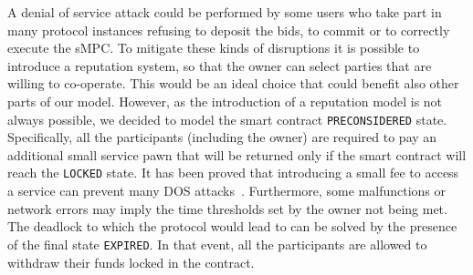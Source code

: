 A denial of service attack could be performed by some users who take part in many \shortname protocol instances refusing to deposit the bids, to commit or to correctly execute the sMPC. 
To mitigate these kinds of disruptions it is possible to introduce a reputation system, so that the owner can select parties that are willing to co-operate. 
This would be an ideal choice that could benefit also other parts of our model. However, as the introduction of a reputation model is not always possible, we decided to model the smart contract \texttt{PRE\textunderscore CONSIDERED} state. 
Specifically, all the participants (including the owner) are required to pay an additional small service pawn that will be returned only if the smart contract will reach the \texttt{LOCKED} state. 
It has been proved that introducing a small fee to access a service can prevent many DOS attacks~\cite{ddos-payments,ddos-survey}. 
Furthermore, some malfunctions or network errors may imply the time thresholds set by the owner not being met.
The deadlock to which the protocol would lead to can be solved by the presence of the final state \texttt{EXPIRED}. 
In that event, all the participants are allowed to withdraw their funds locked in the contract.  
